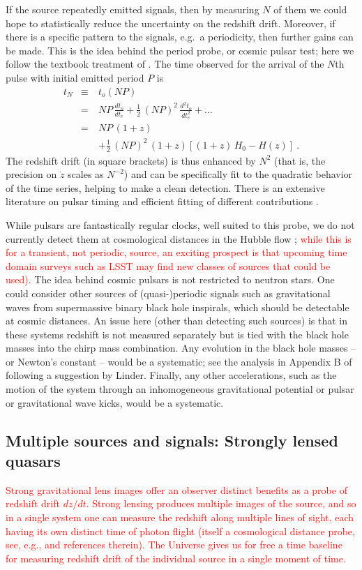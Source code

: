 \documentclass[preprint2, 10pt]{aastex}
\newcommand{\bea}{\begin{eqnarray}}
\newcommand{\eea}{\end{eqnarray}}
\begin{document}
If the source repeatedly emitted signals, then by measuring $N$ of them 
we could hope to statistically reduce the uncertainty on the redshift drift.  
Moreover, if there 
is a specific pattern to the signals, e.g.\ a periodicity, then further 
gains can be made.  This is the idea behind the period probe, or cosmic 
pulsar test; here we follow the textbook treatment of \citet{fpoc}.  The time 
observed for the arrival of the $N$th pulse with initial emitted period $P$ is 
\bea 
t_N&\equiv& t_o(NP)\nonumber\\ 
&=&NP\,\frac{dt_o}{dt_e}+\frac{1}{2}\,(NP)^2\,\frac{d^2t_o}{dt_e^2}+\dots\\ 
&=&NP\,(1+z)\nonumber\\ 
&\quad&+\frac{1}{2}\,(NP)^2\,(1+z)\left[(1+z)\,H_0-H(z)\right]\ . 
\eea 
The redshift drift (in square brackets) is thus enhanced by $N^2$ (that 
is, the precision on $\dot z$ scales as $N^{-2}$) and 
can be specifically fit to the quadratic behavior of the time series, 
helping to make a clean detection.  There is an extensive literature on 
pulsar timing and efficient fitting of different contributions 
\citep{pulsars}. 

While pulsars are fantastically regular clocks, well suited to this probe, 
we do not currently detect them at cosmological distances in the Hubble 
flow \citep[but see][]{13071628};
\textcolor{red}{
while this is for a transient, 
not periodic, source, an exciting prospect is that upcoming time domain surveys 
such as LSST may find new classes of sources that could be used).} 
The idea behind cosmic pulsars is not 
restricted to neutron stars.  
One could consider other sources of (quasi-)periodic signals such as 
gravitational waves from supermassive binary black hole inspirals, which 
should be detectable 
at cosmic distances.  An issue here (other than detecting such sources) 
is that in these systems redshift is not measured separately but is tied 
with the black hole masses into the chirp mass combination.  Any evolution 
in the black hole masses -- or Newton's constant -- would be a systematic; 
see the analysis in Appendix B of \citet{09122724} following a suggestion 
by Linder.  Finally, any other accelerations, such as the motion of the system 
through an inhomogeneous gravitational potential or pulsar or gravitational 
wave kicks, would be a systematic. 


\subsection{Multiple sources and signals: Strongly lensed quasars} \label{sec:lens} 
\textcolor{red}{
Strong gravitational lens images offer an observer distinct
benefits as a probe of redshift drift $dz/dt$. Strong lensing produces multiple images of the source, 
and so in a single system one can measure the redshift along multiple 
lines of sight, each having its own distinct time of photon flight (itself
a cosmological distance probe, see, e.g., \citet{13061272} 
and references therein).
The Universe gives us for free a time baseline for measuring
redshift drift of the individual source in a single moment of time.
}
\end{document}
